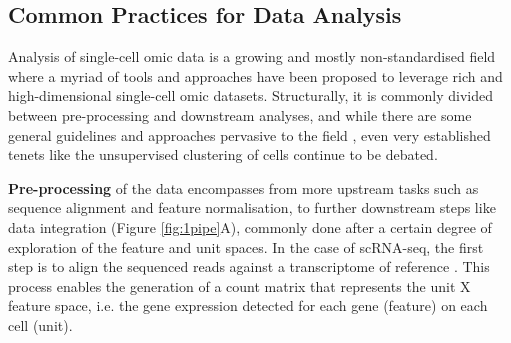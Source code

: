 \subsection{Common Practices for Data Analysis}





Analysis of single-cell omic data is a growing and mostly non-standardised field where a myriad of tools and approaches have been proposed to leverage rich and high-dimensional single-cell omic datasets. Structurally, it is commonly divided between pre-processing and downstream analyses, and while there are some general guidelines and approaches pervasive to the field \cite{luecken_current_2019, heumos_best_2023}, even very established tenets like the unsupervised clustering of cells continue to be debated.

\textbf{Pre-processing} of the data encompasses from more upstream tasks such as sequence alignment and feature normalisation, to further downstream steps like data integration (Figure \ref{fig:1pipe}A), commonly done after a certain degree of exploration of the feature and unit spaces. In the case of scRNA-seq, the first step is to align the sequenced reads against a transcriptome of reference \cite{dobin_star_2013,bray_near-optimal_2016}. This process enables the generation of a count matrix that represents the unit X feature space, i.e. the gene expression detected for each gene (feature) on each cell (unit).

